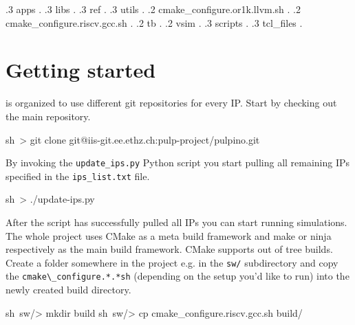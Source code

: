 \begin{flushleft}
{    .3 apps .
    .3 libs .
    .3 ref .
    .3 utils .
  .2 cmake\_configure.or1k.llvm.sh .
  .2 cmake\_configure.riscv.gcc.sh .
  .2 tb .
  .2 vsim .
    .3 scripts .
    .3 tcl\_files .
}
\end{flushleft}


\section{Getting started}
\label{sec:getting_started}

\pulpino is organized to use different git repositories for every IP. Start by checking out the main repository.

\begin{shellenv}
sh~> git clone git@iis-git.ee.ethz.ch:pulp-project/pulpino.git
\end{shellenv}

By invoking the \verb+update_ips.py+ Python script you start pulling all remaining IPs specified in the \verb+ips_list.txt+ file. 

\begin{shellenv}
sh~> ./update-ips.py
\end{shellenv}


After the script has successfully pulled all IPs you can start running simulations. The whole \pulpino project uses CMake as a meta build framework and make or ninja respectively as the main build framework. CMake supports out of tree builds. Create a folder somewhere in the project e.g. in the \verb+sw/+ subdirectory and copy the \verb+cmake\_configure.*.*sh+ (depending on the setup you'd like to run) into the newly created build directory.

\begin{shellenv}
sh~sw/> mkdir build
sh~sw/> cp cmake_configure.riscv.gcc.sh build/
\end{shellenv}


